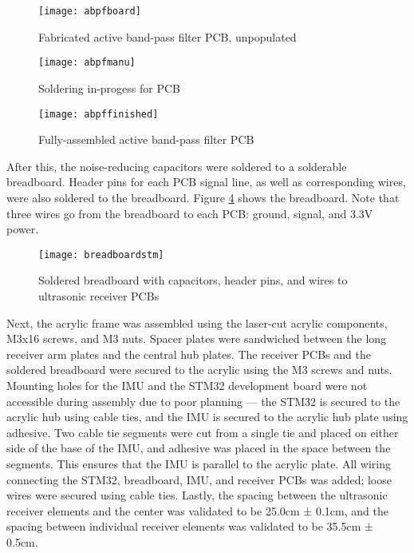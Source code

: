 \documentclass[11pt]{ucthesisCP}
\begin{document}
\begin{figure}[htbp]
	\centering
	\texttt{[image: abpfboard]}
	\caption{Fabricated active band-pass filter PCB, unpopulated}
	\label{fig:abpfboard}
\end{figure}

\begin{figure}[htbp]
	\centering
	\texttt{[image: abpfmanu]}
	\caption{Soldering in-progess for PCB}
	\label{fig:abpfmanu}
\end{figure}

\begin{figure}[htbp]
	\centering
	\texttt{[image: abpffinished]}
	\caption{Fully-assembled active band-pass filter PCB}
	\label{fig:abpffinished}
\end{figure}

After this, the noise-reducing capacitors were soldered to a solderable breadboard. Header pins for each PCB signal line, as well as corresponding wires, were also soldered to the breadboard. Figure \ref{fig:breadboardstm} shows the breadboard. Note that three wires go from the breadboard to each PCB: ground, signal, and 3.3V power.

\begin{figure}[htbp]
	\centering
	\texttt{[image: breadboardstm]}
	\caption{Soldered breadboard with capacitors, header pins, and wires to ultrasonic receiver PCBs}
	\label{fig:breadboardstm}
\end{figure}

Next, the acrylic frame was assembled using the laser-cut acrylic components, M3x16 screws, and M3 nuts. Spacer plates were sandwiched between the long receiver arm plates and the central hub plates. The receiver PCBs and the soldered breadboard were secured to the acrylic using the M3 screws and nuts. Mounting holes for the IMU and the STM32 development board were not accessible during assembly due to poor planning --- the STM32 is secured to the acrylic hub using cable ties, and the IMU is secured to the acrylic hub plate using adhesive. Two cable tie segments were cut from a single tie and placed on either side of the base of the IMU, and adhesive was placed in the space between the segments. This ensures that the IMU is parallel to the acrylic plate. All wiring connecting the STM32, breadboard, IMU, and receiver PCBs was added; loose wires were secured using cable ties. Lastly, the spacing between the ultrasonic receiver elements and the center was validated to be 25.0cm ± 0.1cm, and the spacing between individual receiver elements was validated to be 35.5cm ± 0.5cm.
\end{document}
